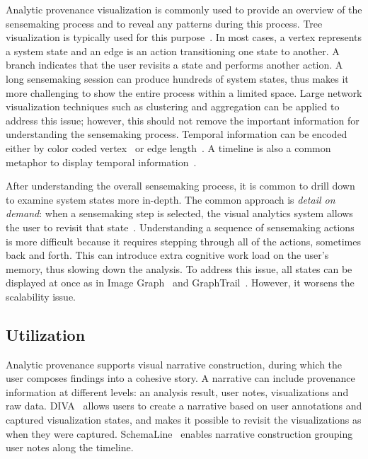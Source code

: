 Analytic provenance visualization is commonly used to provide an overview of the sensemaking process and to reveal any patterns during this process. Tree visualization is typically used for this purpose~\cite{Pike2007,Kadivar2009,Gotz2010,Dunne2012}. In most cases, a vertex represents a system state and an edge is an action transitioning one state to another. A branch indicates that the user revisits a state and performs another action. A long sensemaking session can produce hundreds of system states, thus makes it more challenging to show the entire process within a limited space. Large network visualization techniques such as clustering and aggregation can be applied to address this issue; however, this should not remove the important information for understanding the sensemaking process. Temporal information can be encoded either by color coded vertex~\cite{Bavoil2005} or edge length~\cite{Shrinivasan2008}. A timeline is also a common metaphor to display temporal information~\cite{Pioch2006, Nguyen2015}.

After understanding the overall sensemaking process, it is common to drill down to examine system states more in-depth. The common approach is \emph{detail on demand}: when a sensemaking step is selected, the visual analytics system allows the user to revisit that state~\cite{Pike2007,Shrinivasan2008,Kadivar2009}. Understanding a sequence of sensemaking actions is more difficult because it requires stepping through all of the actions, sometimes back and forth. This can introduce extra cognitive work load on the user's memory, thus slowing down the analysis. To address this issue, all states can be displayed at once as in Image Graph~\cite{Ma1999} and GraphTrail~\cite{Dunne2012}. However, it worsens the scalability issue.

\subsection{Utilization}
Analytic provenance supports visual narrative construction, during which the user composes findings into a cohesive story. A narrative can include provenance information at different levels: an analysis result, user notes, visualizations and raw data. DIVA~\cite{Walker2013} allows users to create a narrative based on user annotations and captured visualization states, and makes it possible to revisit the visualizations as when they were captured. SchemaLine~\cite{Nguyen2014} enables narrative construction grouping user notes along the timeline.

